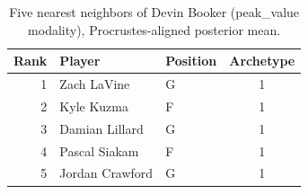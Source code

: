 \begin{table}[htbp]
  \centering\small
  \begin{tabular}{rllc}
    \toprule
    Rank & Player & Position & Archetype \\
    \midrule
    1 & Zach LaVine & G & 1 \\
    2 & Kyle Kuzma & F & 1 \\
    3 & Damian Lillard & G & 1 \\
    4 & Pascal Siakam & F & 1 \\
    5 & Jordan Crawford & G & 1 \\
    \bottomrule
  \end{tabular}
  \caption{Five nearest neighbors of Devin Booker (peak_value modality), Procrustes-aligned posterior mean.}
  \label{tab:Devin_Booker_neighbors_peak_value}
\end{table}

